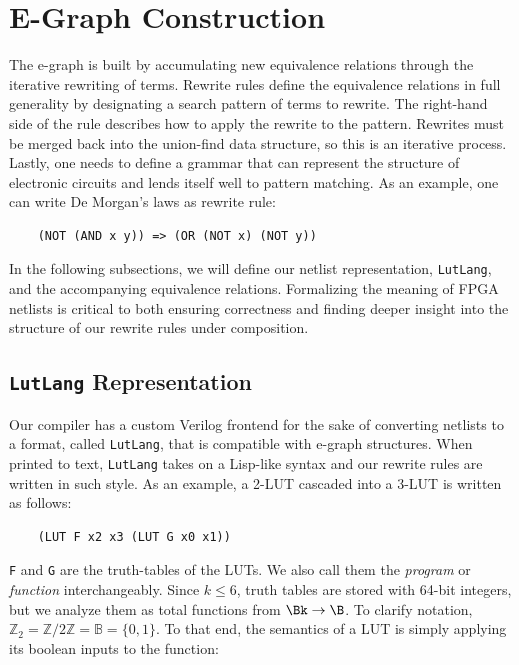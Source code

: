 \section{E-Graph Construction}\label{sec:rewrites}
The e-graph is built by accumulating new equivalence relations through the
iterative rewriting of terms. Rewrite rules define the equivalence relations in
full generality by designating a search pattern of terms to rewrite. The
right-hand side of the rule describes how to apply the rewrite to the pattern.
Rewrites must be merged back into the union-find data structure, so this is an
iterative process. Lastly, one needs to define a grammar that can represent the
structure of electronic circuits and lends itself well to pattern matching. As
an example, one can write De Morgan's laws as rewrite rule:

\begin{verbatim}
    (NOT (AND x y)) => (OR (NOT x) (NOT y))
\end{verbatim}

In the following subsections, we will define our netlist representation,
\texttt{LutLang}, and the accompanying equivalence relations. Formalizing the
meaning of FPGA netlists is critical to both ensuring correctness and finding
deeper insight into the structure of our rewrite rules under composition.

\subsection{\texttt{LutLang} Representation}\label{sec:rewrites:lutlang}

Our compiler has a custom Verilog frontend for the sake of converting netlists
to a format, called \texttt{LutLang}, that is compatible with e-graph
structures. When printed to text, \texttt{LutLang} takes on a Lisp-like syntax
and our rewrite rules are written in such style. As an example, a 2-LUT
cascaded into a 3-LUT is written as follows:

\begin{verbatim}
    (LUT F x2 x3 (LUT G x0 x1))
\end{verbatim}

\texttt{F} and \texttt{G} are the truth-tables of the LUTs.
We also call them the \textit{program} or \textit{function} interchangeably.
Since $k \leq 6$, truth tables are stored with 64-bit integers, but we analyze them as total functions from $\Bk \rightarrow \B$.
To clarify notation, $\mathbb{Z}_2 = \mathbb{Z}/2\mathbb{Z} = \mathbb{B} = \{0,1\}$.
To that end, the semantics of a LUT is simply applying its boolean inputs to the function:

